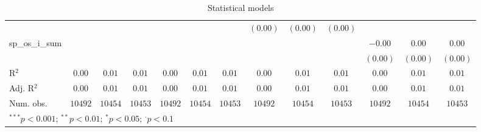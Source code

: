 \begin{sidewaystable}
\begin{center}
{\begin{tabular}{l c c c c c c c c c c c c}
                    &               &                 &                 &               &                 &              & $(0.00)$      & $(0.00)$     & $(0.00)$     &               &              &              \\
sp\_os\_i\_sum      &               &                 &                 &               &                 &              &               &              &              & $-0.00$       & $0.00$       & $0.00$       \\
                    &               &                 &                 &               &                 &              &               &              &              & $(0.00)$      & $(0.00)$     & $(0.00)$     \\
\hline
R$^2$               & $0.00$        & $0.01$          & $0.01$          & $0.00$        & $0.01$          & $0.01$       & $0.00$        & $0.01$       & $0.01$       & $0.00$        & $0.01$       & $0.01$       \\
Adj. R$^2$          & $0.00$        & $0.01$          & $0.01$          & $0.00$        & $0.01$          & $0.01$       & $0.00$        & $0.01$       & $0.01$       & $0.00$        & $0.01$       & $0.01$       \\
Num. obs.           & $10492$       & $10454$         & $10453$         & $10492$       & $10454$         & $10453$      & $10492$       & $10454$      & $10453$      & $10492$       & $10454$      & $10453$      \\
\hline
\multicolumn{13}{l}{\scriptsize{$^{***}p<0.001$; $^{**}p<0.01$; $^{*}p<0.05$; $^{\cdot}p<0.1$}}
\end{tabular}
}
\caption{Statistical models}
\label{table:coefficients}
\end{center}
\end{sidewaystable}
